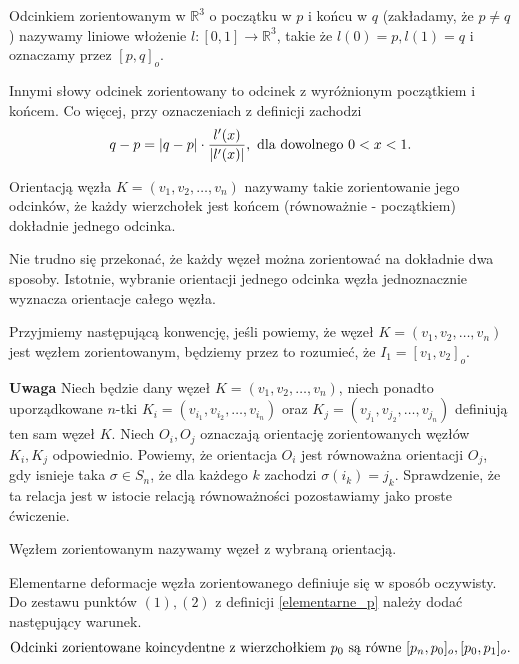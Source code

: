 \begin{definicja}
 Odcinkiem zorientowanym w $\mathbb{R}^3$ o początku w $p$ i końcu w $q$ (zakładamy, że $p\neq q$) nazywamy liniowe włożenie $l\colon[0,1]\to\mathbb{R}^3$, takie że $l(0) = p, l(1) = q$ i oznaczamy przez
 $[p,q]_o$. 
\end{definicja}

Innymi słowy odcinek zorientowany to odcinek z wyróżnionym początkiem i końcem. Co więcej, przy oznaczeniach z definicji zachodzi
\begin{displaymath}
 q-p =  |q-p|\cdot\frac{l'(x)}{|l'(x)|}, \hbox{ dla dowolnego } 0 < x < 1.
\end{displaymath}

\begin{definicja}
 Orientacją węzła $K = (v_1, v_2, \ldots, v_n)$ nazywamy takie zorientowanie jego odcinków, że każdy wierzchołek jest końcem (równoważnie - początkiem) dokładnie jednego odcinka.
\end{definicja}

Nie trudno się przekonać, że każdy węzeł można zorientować na dokładnie dwa sposoby. Istotnie, wybranie orientacji jednego odcinka węzła jednoznacznie wyznacza orientacje całego
węzła. 

Przyjmiemy następującą konwencję, jeśli powiemy, że węzeł $K = (v_1, v_2, \ldots, v_n)$ jest węzłem zorientowanym, będziemy przez to rozumieć, że $I_1 = [v_1, v_2]_o$.

\textbf{Uwaga} Niech będzie dany węzeł $K = (v_1, v_2, \ldots, v_n)$, niech ponadto uporządkowane $n$-tki $K_i = (v_{i_1}, v_{i_2}, \ldots, v_{i_n})$ 
oraz $K_j = (v_{j_1}, v_{j_2}, \ldots, v_{j_n})$ definiują ten sam węzeł $K$. Niech $O_i, O_j$ oznaczają orientację zorientowanych węzłów $K_i, K_j$ odpowiednio. Powiemy, że orientacja
$O_i$ jest równoważna orientacji $O_j$, gdy isnieje taka $\sigma\in S_n$, że dla każdego $k$ zachodzi $\sigma(i_k) = j_k$. Sprawdzenie, że ta relacja jest w istocie relacją równoważności
pozostawiamy jako proste ćwiczenie. 

\begin{definicja}
 Węzłem zorientowanym nazywamy węzeł z wybraną orientacją.
\end{definicja}

Elementarne deformacje węzła zorientowanego definiuje się w sposób oczywisty. Do zestawu punktów $(1), (2)$ z definicji \ref{elementarne_p} należy dodać następujący warunek.
\begin{displaymath}
 \hbox{Odcinki zorientowane koincydentne z wierzchołkiem } p_0 \hbox{ są równe }[p_n, p_0]_o, [p_0, p_1]_o.
\end{displaymath}

